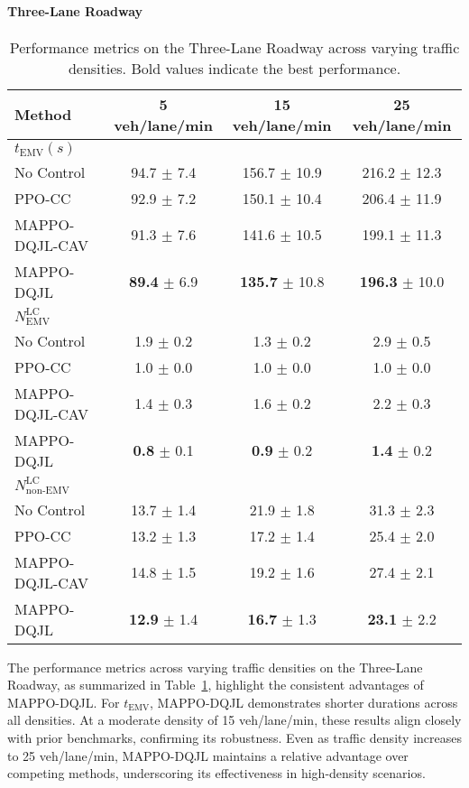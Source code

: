 \paragraph{Three-Lane Roadway}
\begin{table}[htbp]
\centering
\begin{tabular}{lccc}
\toprule
\textbf{Method} & \textbf{5 veh/lane/min} & \textbf{15 veh/lane/min} & \textbf{25 veh/lane/min} \\
\midrule
\textbf{\textit{$t_{\text{EMV}} (s)$}} & & & \\ 
No Control        & 94.7 $\pm$ 7.4 & 156.7 $\pm$ 10.9 & 216.2 $\pm$ 12.3 \\
PPO-CC~\cite{suo2024model} & 92.9 $\pm$ 7.2 & 150.1 $\pm$ 10.4 & 206.4 $\pm$ 11.9 \\
MAPPO-DQJL-CAV    & 91.3 $\pm$ 7.6 & 141.6 $\pm$ 10.5 & 199.1 $\pm$ 11.3 \\
MAPPO-DQJL        & \textbf{89.4} $\pm$ 6.9 & \textbf{135.7} $\pm$ 10.8 & \textbf{196.3} $\pm$ 10.0 \\
\midrule
\textbf{\textit{\boldmath$N_{\text{EMV}}^{\text{LC}}$}} & & & \\ 
No Control        & 1.9 $\pm$ 0.2 & 1.3 $\pm$ 0.2 & 2.9 $\pm$ 0.5 \\
PPO-CC~\cite{suo2024model} & 1.0 $\pm$ 0.0 & 1.0 $\pm$ 0.0 & 1.0 $\pm$ 0.0 \\
MAPPO-DQJL-CAV    & 1.4 $\pm$ 0.3 & 1.6 $\pm$ 0.2 & 2.2 $\pm$ 0.3 \\
MAPPO-DQJL        & \textbf{0.8} $\pm$ 0.1 & \textbf{0.9} $\pm$ 0.2 & \textbf{1.4} $\pm$ 0.2 \\
\midrule
\textbf{\textit{\boldmath$N_{\text{non-EMV}}^{\text{LC}}$}} & & & \\ 
No Control        & 13.7 $\pm$ 1.4 & 21.9 $\pm$ 1.8 & 31.3 $\pm$ 2.3 \\
PPO-CC~\cite{suo2024model} & 13.2 $\pm$ 1.3 & 17.2 $\pm$ 1.4 & 25.4 $\pm$ 2.0 \\
MAPPO-DQJL-CAV    & 14.8 $\pm$ 1.5 & 19.2 $\pm$ 1.6 & 27.4 $\pm$ 2.1 \\
MAPPO-DQJL        & \textbf{12.9} $\pm$ 1.4 & \textbf{16.7} $\pm$ 1.3 & \textbf{23.1} $\pm$ 2.2 \\
\bottomrule
\end{tabular}
\caption{Performance metrics on the Three-Lane Roadway across varying traffic densities. Bold values indicate the best performance.}
\label{tab:density_three_lane}
\end{table}

The performance metrics across varying traffic densities on the Three-Lane Roadway, as summarized in Table~\ref{tab:density_three_lane}, highlight the consistent advantages of MAPPO-DQJL. For \textit{\boldmath$t_{\text{EMV}}$}, MAPPO-DQJL demonstrates shorter durations across all densities. At a moderate density of 15 veh/lane/min, these results align closely with prior benchmarks, confirming its robustness. Even as traffic density increases to 25 veh/lane/min, MAPPO-DQJL maintains a relative advantage over competing methods, underscoring its effectiveness in high-density scenarios.

